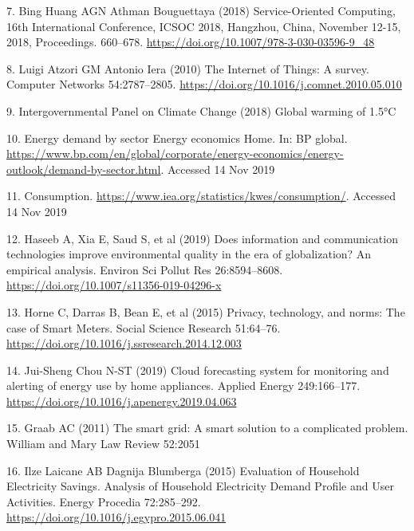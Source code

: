 \documentclass[11pt,]{article}
\begin{document}
\leavevmode\hypertarget{ref-binghuangServiceOrientedComputing16th2018}{}%
7. Bing Huang AGN Athman Bouguettaya (2018) Service-Oriented Computing,
16th International Conference, ICSOC 2018, Hangzhou, China, November
12-15, 2018, Proceedings. 660--678.
\url{https://doi.org/10.1007/978-3-030-03596-9_48}

\leavevmode\hypertarget{ref-luigiatzoriInternetThingsSurvey2010}{}%
8. Luigi Atzori GM Antonio Iera (2010) The Internet of Things: A survey.
Computer Networks 54:2787--2805.
\url{https://doi.org/10.1016/j.comnet.2010.05.010}

\leavevmode\hypertarget{ref-intergovernmentalpanelonclimatechangeGlobalWarming2018}{}%
9. Intergovernmental Panel on Climate Change (2018) Global warming of
1.5°C

\leavevmode\hypertarget{ref-EnergyDemandSector}{}%
10. Energy demand by sector \textbar{} Energy economics \textbar{} Home.
In: BP global.
\url{https://www.bp.com/en/global/corporate/energy-economics/energy-outlook/demand-by-sector.html}.
Accessed 14 Nov 2019

\leavevmode\hypertarget{ref-Consumption}{}%
11. Consumption. \url{https://www.iea.org/statistics/kwes/consumption/}.
Accessed 14 Nov 2019

\leavevmode\hypertarget{ref-haseebDoesInformationCommunication2019}{}%
12. Haseeb A, Xia E, Saud S, et al (2019) Does information and
communication technologies improve environmental quality in the era of
globalization? An empirical analysis. Environ Sci Pollut Res
26:8594--8608. \url{https://doi.org/10.1007/s11356-019-04296-x}

\leavevmode\hypertarget{ref-hornePrivacyTechnologyNorms2015}{}%
13. Horne C, Darras B, Bean E, et al (2015) Privacy, technology, and
norms: The case of Smart Meters. Social Science Research 51:64--76.
\url{https://doi.org/10.1016/j.ssresearch.2014.12.003}

\leavevmode\hypertarget{ref-jui-shengchouCloudForecastingSystem2019}{}%
14. Jui-Sheng Chou N-ST (2019) Cloud forecasting system for monitoring
and alerting of energy use by home appliances. Applied Energy
249:166--177. \url{https://doi.org/10.1016/j.apenergy.2019.04.063}

\leavevmode\hypertarget{ref-graabSmartGridSmart2011}{}%
15. Graab AC (2011) The smart grid: A smart solution to a complicated
problem. William and Mary Law Review 52:2051

\leavevmode\hypertarget{ref-ilzelaicaneEvaluationHouseholdElectricity2015}{}%
16. Ilze Laicane AB Dagnija Blumberga (2015) Evaluation of Household
Electricity Savings. Analysis of Household Electricity Demand Profile
and User Activities. Energy Procedia 72:285--292.
\url{https://doi.org/10.1016/j.egypro.2015.06.041}
\end{document}
